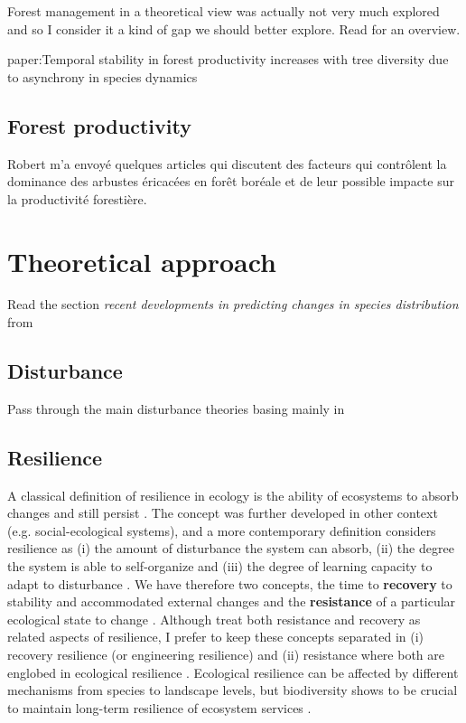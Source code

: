 Forest management in a theoretical view was actually not very much explored and so I consider it a kind of gap we should better explore. Read \citet{Becknell2015} for an overview.

paper:Temporal stability in forest productivity increases with tree diversity due to asynchrony in species dynamics

\subsection{Forest productivity}
Robert m'a envoyé quelques articles qui discutent des facteurs qui contrôlent la dominance des arbustes éricacées en forêt boréale et de leur possible impacte sur la productivité forestière.

\section{Theoretical approach}\label{ta}

Read the section \textit{recent developments in predicting changes in species distribution} from \citet{Ehrlen2015}

\subsection{Disturbance}
Pass through the main disturbance theories basing mainly in \citet{Pulsford2016}

\subsection{Resilience}\label{res}

A classical definition of resilience in ecology is the ability of ecosystems to absorb changes and still persist \citep{Holling1973}.
The concept was further developed in other context (e.g. social-ecological systems), and a more contemporary definition considers resilience as (i) the amount of disturbance the system can absorb, (ii) the degree the system is able to self-organize and (iii) the degree of learning capacity to adapt to disturbance \citep{Cumming2011}.
We have therefore two concepts, the time to \textbf{recovery} to stability and accommodated external changes \citep{pimm1984,Folke2002} and the \textbf{resistance} of a particular ecological state to change \citep{Peterson1998}.
Although \citet{Oliver2015} treat both resistance and recovery as related aspects of resilience, I prefer to keep these concepts separated in (i) recovery resilience (or engineering resilience) and (ii) resistance where both are englobed in ecological resilience \citep{Hodgson2015,Nimmo2015}.
Ecological resilience can be affected by different mechanisms from species to landscape levels, but biodiversity shows to be crucial to maintain long-term resilience of ecosystem services \citep{Oliver2015}.

